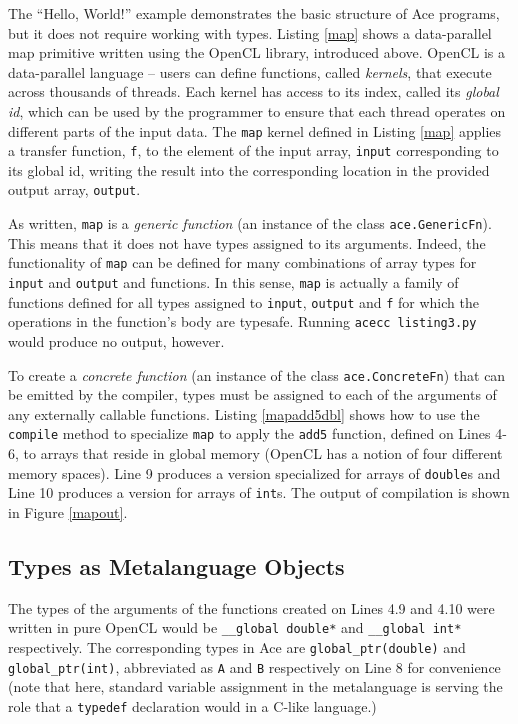 \documentclass[10pt, conference, compsocconf]{IEEEtran}
\begin{document}
The ``Hello, World!'' example demonstrates the basic structure of Ace programs, but it does not require working with types. Listing \ref{map} shows a data-parallel map primitive written using the OpenCL library, introduced above. OpenCL is a data-parallel language -- users can define functions, called {\em kernels}, that execute across thousands of threads. Each kernel has access to its index, called its {\em global id}, which can be used by the programmer to ensure that each thread operates on different parts of the input data. The \verb|map| kernel defined in Listing \ref{map} applies a transfer function, \verb|f|, to the element of the input array, \verb|input| corresponding to its global id, writing the result into the corresponding location in the provided output array, \verb|output|.

As written, \verb|map| is a {\em generic function} (an instance of the class \verb|ace.GenericFn|). This means that it does not have types assigned to its arguments. Indeed, the functionality of \verb|map| can be defined for many combinations of array types for \verb|input| and \verb|output| and functions. In this sense, \verb|map| is actually a family of functions defined for all types assigned to \verb|input|, \verb|output| and \verb|f| for which the operations in the function's body are typesafe. Running \verb|acecc listing3.py| would produce no output, however.

To create a {\em concrete function} (an instance of the class \verb|ace.ConcreteFn|) that can be emitted by the compiler,  types must be assigned to each of the arguments of any externally callable functions. Listing \ref{mapadd5dbl} shows how to use the \verb|compile| method to specialize \verb|map| to apply the \verb|add5| function, defined on Lines 4-6, to arrays  that reside in global memory (OpenCL has a notion of four different memory spaces). Line 9 produces a version specialized for arrays of \verb|double|s and Line 10 produces a version for arrays of \verb|int|s. The output of compilation is shown in Figure \ref{mapout}.

\subsection{Types as Metalanguage Objects}
The types of the arguments of the functions created on Lines 4.9 and 4.10 were written in pure OpenCL would be \verb|__global double*| and \verb|__global int*| respectively. The corresponding types in Ace are \verb|global_ptr(double)| and \verb|global_ptr(int)|, abbreviated as \verb|A| and \verb|B| respectively on Line 8 for convenience (note that here, standard variable assignment in the metalanguage is serving the role that a \verb|typedef| declaration would in a C-like language.)
\end{document}
